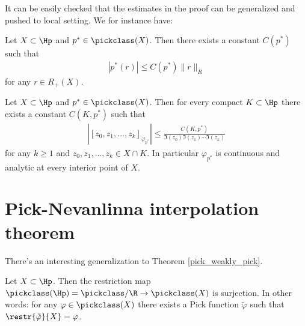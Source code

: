 It can be easily checked that the estimates in the proof can be generalized and pushed to local setting. We for instance have:
\begin{lem}\label{general_pick_norm_estimate}
	Let $X \subset \Hp$ and $p^{*} \in \pickclass(X)$. Then there exists a constant $C(p^{*})$ such that
	\begin{align*}
		\left|p^{*} (r)\right| \leq C(p^{*}) \|r\|_{R}
	\end{align*}
	for any $r \in R_{+}(X)$.
\end{lem}
\begin{prop}\label{pick_div_dif_estimate}
	Let $X \subset \Hp$ and $p^{*} \in \pickclass(X)$. Then for every compact $K \subset \Hp$ there exists a constant $C(K, p^{*})$ such that
	\begin{align*}
		\left|[z_{0}, z_{1}, \ldots, z_{k}]_{\varphi_{p^{*}}}\right| \leq \frac{C(K, p^{*})}{\Im(z_{0}) \Im(z_{1}) \cdots \Im(z_{k})}
	\end{align*}
	for any $k \geq 1$ and $z_{0}, z_{1}, \ldots, z_{k} \in X \cap K$. In particular $\varphi_{p^{*}}$ is continuous and analytic at every interior point of $X$.
\end{prop}

\section{Pick-Nevanlinna interpolation theorem}

There's an interesting generalization to Theorem \ref{pick_weakly_pick}.

\begin{lause}\label{pick_interpolation}
	Let $X \subset \Hp$. Then the restriction map $\pickclass(\Hp) = \pickclass/\R \to \pickclass(X)$ is surjection. In other words: for any $\varphi \in \pickclass(X)$ there exists a Pick function $\tilde{\varphi}$ such that $\restr{\tilde{\varphi}}{X} = \varphi$.
\end{lause}

